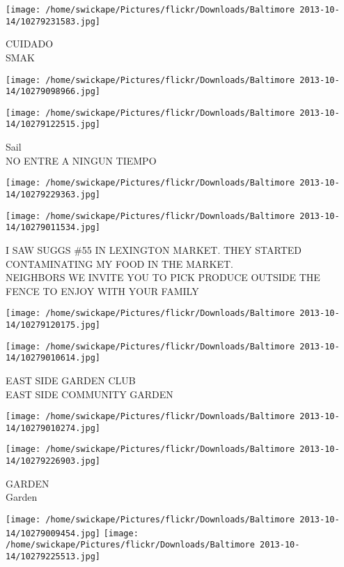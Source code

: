 \documentclass[10pt,letterpaper]{article}
\begin{document}
\vspace{0.25in}
\texttt{[image: /home/swickape/Pictures/flickr/Downloads/Baltimore 2013-10-14/10279231583.jpg]}

CUIDADO\\
SMAK
\pagebreak

\texttt{[image: /home/swickape/Pictures/flickr/Downloads/Baltimore 2013-10-14/10279098966.jpg]}

\vspace{0.25in}
\texttt{[image: /home/swickape/Pictures/flickr/Downloads/Baltimore 2013-10-14/10279122515.jpg]}

Sail\\
NO ENTRE A NINGUN TIEMPO
\pagebreak

\texttt{[image: /home/swickape/Pictures/flickr/Downloads/Baltimore 2013-10-14/10279229363.jpg]}

\vspace{0.25in}
\texttt{[image: /home/swickape/Pictures/flickr/Downloads/Baltimore 2013-10-14/10279011534.jpg]}

I SAW SUGGS \#55 IN LEXINGTON MARKET.  THEY STARTED CONTAMINATING MY FOOD IN THE MARKET.\\
NEIGHBORS WE INVITE YOU TO PICK PRODUCE OUTSIDE THE FENCE TO ENJOY WITH YOUR FAMILY
\pagebreak

\texttt{[image: /home/swickape/Pictures/flickr/Downloads/Baltimore 2013-10-14/10279120175.jpg]}

\vspace{0.25in}
\texttt{[image: /home/swickape/Pictures/flickr/Downloads/Baltimore 2013-10-14/10279010614.jpg]}

EAST SIDE GARDEN CLUB\\
EAST SIDE COMMUNITY GARDEN
\pagebreak

\texttt{[image: /home/swickape/Pictures/flickr/Downloads/Baltimore 2013-10-14/10279010274.jpg]}

\vspace{0.25in}
\texttt{[image: /home/swickape/Pictures/flickr/Downloads/Baltimore 2013-10-14/10279226903.jpg]}

GARDEN\\
Garden
\pagebreak

\texttt{[image: /home/swickape/Pictures/flickr/Downloads/Baltimore 2013-10-14/10279009454.jpg]}
\texttt{[image: /home/swickape/Pictures/flickr/Downloads/Baltimore 2013-10-14/10279225513.jpg]}
\end{document}
